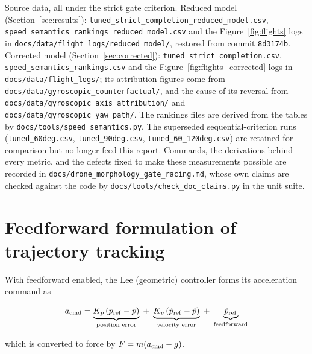 \documentclass[11pt,a4paper]{article}
\begin{document}
\begin{sloppypar}
Source data, all under the strict gate criterion. Reduced model
(Section~\ref{sec:results}): \texttt{tuned\_strict\_completion\_reduced\_model.csv},
\texttt{speed\_semantics\_rankings\_reduced\_model.csv} and the
Figure~\ref{fig:flights} logs in \texttt{docs/data/flight\_logs/reduced\_model/},
restored from commit \texttt{8d3174b}. Corrected model
(Section~\ref{sec:corrected}): \texttt{tuned\_strict\_completion.csv},
\texttt{speed\_semantics\_rankings.csv} and the Figure~\ref{fig:flights_corrected}
logs in \texttt{docs/data/flight\_logs/}; its attribution figures come from
\texttt{docs/data/gyroscopic\_counterfactual/}, and the cause of its reversal from
\texttt{docs/data/gyroscopic\_axis\_attribution/} and
\texttt{docs/data/gyroscopic\_yaw\_path/}. The rankings files are derived
from the tables by \texttt{docs/tools/speed\_semantics.py}.
The superseded sequential-criterion runs
(\texttt{tuned\_60deg.csv}, \texttt{tuned\_90deg.csv},
\texttt{tuned\_60\_120deg.csv}) are retained for comparison but no longer feed
this report. Commands, the
derivations behind every metric, and the defects fixed to make these
measurements possible are recorded in
\texttt{docs/drone\_morphology\_gate\_racing.md}, whose own claims are checked
against the code by \texttt{docs/tools/check\_doc\_claims.py} in the unit suite.
\end{sloppypar}


\appendix

\section{Feedforward formulation of trajectory tracking}\label{sec:feedforward}

With feedforward enabled, the Lee (geometric) controller forms its acceleration
command as

\[
  a_{\rm cmd}
  = \underbrace{K_p\,(p_{\rm ref} - p)}_{\text{position error}}
  \;+\; \underbrace{K_v\,(\dot p_{\rm ref} - \dot p)}_{\text{velocity error}}
  \;+\; \underbrace{\ddot p_{\rm ref}}_{\text{feedforward}}
\]

which is converted to force by $F = m(a_{\rm cmd} - g)$.
\end{document}
